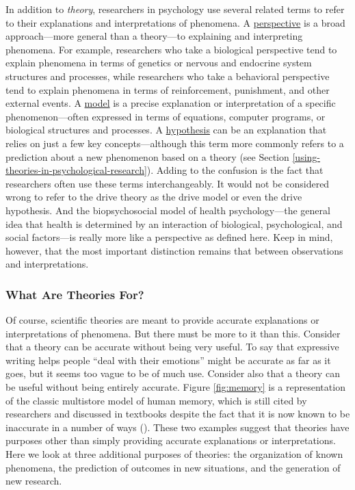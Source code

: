 \documentclass[
]{krantz}
\begin{document}
In addition to \emph{theory}, researchers in psychology use several related terms to refer to their explanations and interpretations of phenomena. A \hyperref[perspective]{perspective} is a broad approach---more general than a theory---to explaining and interpreting phenomena. For example, researchers who take a biological perspective tend to explain phenomena in terms of genetics or nervous and endocrine system structures and processes, while researchers who take a behavioral perspective tend to explain phenomena in terms of reinforcement, punishment, and other external events. A \hyperref[model]{model} is a precise explanation or interpretation of a specific phenomenon---often expressed in terms of equations, computer programs, or biological structures and processes. A \hyperref[hypothesis]{hypothesis} can be an explanation that relies on just a few key concepts---although this term more commonly refers to a prediction about a new phenomenon based on a theory (see Section \ref{using-theories-in-psychological-research}). Adding to the confusion is the fact that researchers often use these terms interchangeably. It would not be considered wrong to refer to the drive theory as the drive model or even the drive hypothesis. And the biopsychosocial model of health psychology---the general idea that health is determined by an interaction of biological, psychological, and social factors---is really more like a perspective as defined here. Keep in mind, however, that the most important distinction remains that between observations and interpretations.

\subsubsection*{What Are Theories For?}\label{what-are-theories-for}


Of course, scientific theories are meant to provide accurate explanations or interpretations of phenomena. But there must be more to it than this. Consider that a theory can be accurate without being very useful. To say that expressive writing helps people ``deal with their emotions'' might be accurate as far as it goes, but it seems too vague to be of much use. Consider also that a theory can be useful without being entirely accurate. Figure \ref{fig:memory} is a representation of the classic multistore model of human memory, which is still cited by researchers and discussed in textbooks despite the fact that it is now known to be inaccurate in a number of ways (). These two examples suggest that theories have purposes other than simply providing accurate explanations or interpretations. Here we look at three additional purposes of theories: the organization of known phenomena, the prediction of outcomes in new situations, and the generation of new research.
\end{document}
